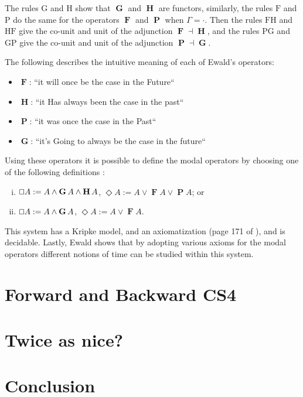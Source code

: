 \documentclass{article}
\renewcommand{\Box}{\oblong}
\newcommand{\F}{\mathop{\textbf{F}}}
\renewcommand{\P}{\mathop{\textbf{P}}}
\newcommand{\G}{\mathop{\textbf{G}}}
\renewcommand{\H}{\mathop{\textbf{H}}}
\begin{document}
The rules $\text{G}$ and $\text{H}$ show that $\G$
and $\H$ are functors, similarly, the rules $\text{F}$ and $\text{P}$
do the same for the operators $\F$ and $\P$ when $\Gamma = \cdot$.
Then the rules $\text{FH}$ and $\text{HF}$ give the co-unit and unit
of the adjunction $\F \dashv \H$, and the rules $\text{PG}$ and
$\text{GP}$ give the co-unit and unit of the adjunction $\P \dashv
\G$.

The following describes the intuitive meaning of each of Ewald's
operators:
\begin{itemize}
\item[] $\F$: ``it will once be the case in the Future``  
\item[] $\H$: ``it Has always been the case in the past``
\item[] $\P$: ``it was once the case in the Past``
\item[] $\G$: ``it's Going to  always be the case in the future``  
\end{itemize}


Using these operators it is possible to define the  modal
operators by choosing one of the following definitions
\cite{ewald1986}:
\begin{enumerate}[i.]
\item $\Box A := A \land \G A \land \H A$, $\Diamond A := A \lor \F A \lor \P A$; or
\item $\Box A := A \land \G A$, $\Diamond A := A \lor \F A$.
\end{enumerate}

This system has a Kripke model, and an axiomatization (page 171 of \cite{ewald1986}), and is decidable.  Lastly, Ewald shows that by
adopting various axioms for the modal operators different notions of
time can be studied within this system.

\section{Forward and Backward CS4}
\section{Twice as nice?}


\section{Conclusion}



\end{document}
